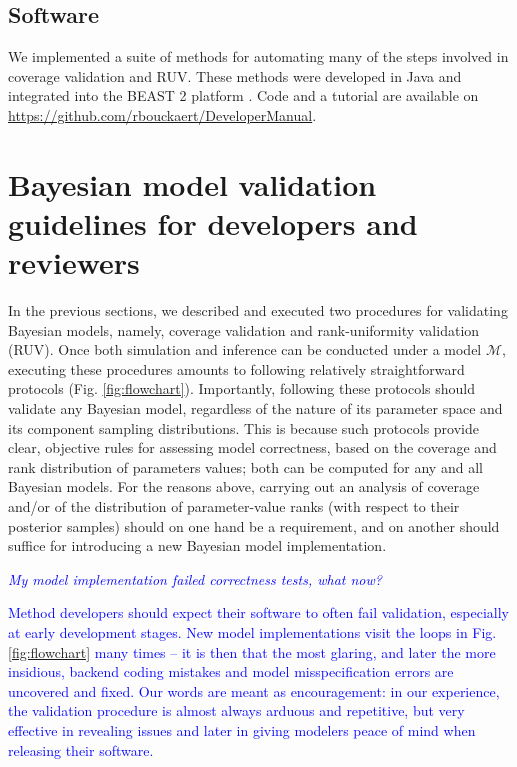 \documentclass[oneside]{article}
\begin{document}
\subsection*{Software}

We implemented a suite of methods for automating many of the steps involved in coverage validation and RUV.
These methods were developed in Java and integrated into the BEAST 2 platform \citep{beast25}.
Code and a tutorial are available on \href{https://github.com/rbouckaert/DeveloperManual}{https://github.com/rbouckaert/DeveloperManual}.


\section*{Bayesian model validation guidelines for developers and reviewers}

In the previous sections, we described and executed two procedures for validating Bayesian models, namely, coverage validation and rank-uniformity validation (RUV).
Once both simulation and inference can be conducted under a model $\mathcal{M}$, executing these procedures amounts to following relatively straightforward protocols (Fig. \ref{fig:flowchart}).
Importantly, following these protocols should validate any Bayesian model, regardless of the nature of its parameter space and its component sampling distributions.
This is because such protocols provide clear, objective rules for
assessing model correctness, based on the coverage and rank
distribution of parameters values; both can be computed for any and all Bayesian models.
For the reasons above, carrying out an analysis of coverage and/or of the distribution of parameter-value ranks (with respect to their posterior samples) should on one hand be a requirement, and on another should suffice for introducing a new Bayesian model implementation.

\vspace{.25cm}

\noindent \emph{\textcolor{blue}{My model implementation failed correctness tests, what now?}}

\textcolor{blue}{Method developers should expect their software to often fail validation, especially at early development stages.
New model implementations visit the loops in Fig. \ref{fig:flowchart} many times -- it is then that the most glaring, and later the more insidious, backend coding mistakes and model misspecification errors are uncovered and fixed.
Our words are meant as encouragement: in our experience, the validation procedure is almost always arduous and repetitive, but very effective in revealing issues and later in giving modelers peace of mind when releasing their software.}
\end{document}
